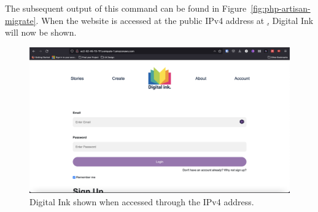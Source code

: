 The subsequent output of this command can be found in Figure~\ref{fig:php-artisan-migrate}.
When the website is accessed at the public IPv4 address at \hyperlink{http://ec2-52-45-13-111.compute-1.amazonaws.com/},
Digital Ink will now be shown.

\begin{figure}[!htbp]
    \centering
    \includegraphics[width=\textwidth]{resources/ec2/digital-ink-ec2}
    \caption{Digital Ink shown when accessed through the IPv4 address. }
    \label{fig:digital-ink-ec2}
\end{figure}
